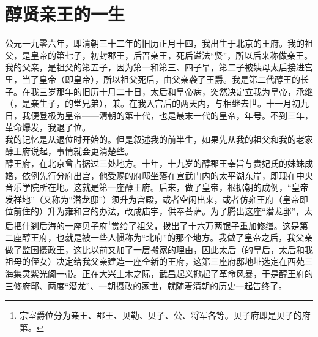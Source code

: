 \fancyhead[RO]{} %
\fancyhead[LE]{} %
\chapter*{醇贤亲王的一生}
\thispagestyle{empty}
公元一九零六年，即清朝三十二年的旧历正月十四，我出生于北京的王府。我的祖父，是皇帝的第七子，初封郡王，后晋亲王，死后谥法“贤”，所以后来称做亲王。我的父亲，是祖父的第五子，因为第一和第三、四子早，第二子被姨母太后接进宫里，当了皇帝（即皇帝），所以祖父死后，由父亲袭了王爵。我是第二代醇王的长子。在我三岁那年的旧历十月二十日，太后和皇帝病，突然决定立我为皇帝，承继（，是亲生子，的堂兄弟），兼。在我入宫后的两天内，与相继去世。十一月初九日，我便登极为皇帝——清朝的第十代，也是最末一代的皇帝，年号。不到三年，革命爆发，我退了位。\\

我的记忆是从退位时开始的。但是叙述我的前半生，如果先从我的祖父和我的老家醇王府说起，事情就会更清楚些。\\

醇王府，在北京曾占据过三处地方。十年，十九岁的醇郡王奉旨与贵妃氏的妹妹成婚，依例先行分府出宫，他受赐的府邸坐落在宣武门内的太平湖东岸，即现在中央音乐学院所在地。这就是第一座醇王府。后来，做了皇帝，根据朝的成例，“皇帝发祥地”（又称为“潜龙邸”）须升为宫殿，或者空闲出来，或者仿雍王府（皇帝即位前住的）升为雍和宫的办法，改成庙宇，供奉菩萨。为了腾出这座“潜龙邸”，太后把什刹后海的一座贝子府\footnote{宗室爵位分为亲王、郡王、贝勒、贝子、公、将军各等。贝子府即是贝子的府第。}赏给了祖父，拨出了十六万两银子重加修缮。这是第二座醇王府，也就是被一些人惯称为“北府”的那个地方。我做了皇帝之后，我父亲做了监国摄政王，这比以前又加了一层搬家的理由，因此太后（的皇后，太后和我祖母的侄女）决定给我父亲建造一座全新的王府，这第三座府邸地址选定在西苑三海集灵紫光阁一带。正在大兴土木之际，武昌起义掀起了革命风暴，于是醇王府的三修府邸、两度“潜龙”、一朝摄政的家世，就随着清朝的历史一起告终了。\\

